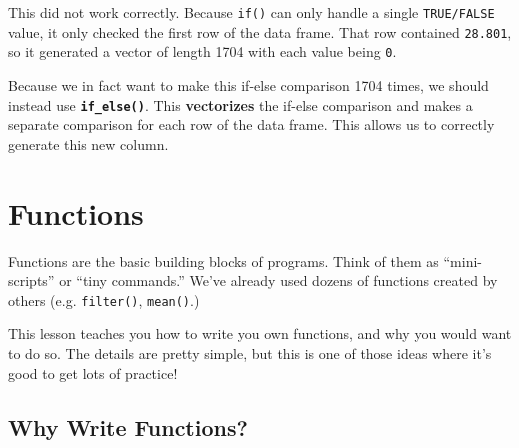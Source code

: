 \documentclass[]{book}
\newenvironment{Shaded}{\begin{snugshade}}{\end{snugshade}}
\newcommand{\KeywordTok}[1]{\textcolor[rgb]{0.13,0.29,0.53}{\textbf{#1}}}
\newcommand{\DataTypeTok}[1]{\textcolor[rgb]{0.13,0.29,0.53}{#1}}
\newcommand{\DecValTok}[1]{\textcolor[rgb]{0.00,0.00,0.81}{#1}}
\newcommand{\StringTok}[1]{\textcolor[rgb]{0.31,0.60,0.02}{#1}}
\newcommand{\CommentTok}[1]{\textcolor[rgb]{0.56,0.35,0.01}{\textit{#1}}}
\newcommand{\OperatorTok}[1]{\textcolor[rgb]{0.81,0.36,0.00}{\textbf{#1}}}
\newcommand{\NormalTok}[1]{#1}
\begin{document}
This did not work correctly. Because \texttt{if()} can only handle a
single \texttt{TRUE/FALSE} value, it only checked the first row of the
data frame. That row contained \texttt{28.801}, so it generated a vector
of length 1704 with each value being \texttt{0}.

Because we in fact want to make this if-else comparison 1704 times, we
should instead use \textbf{\texttt{if\_else()}}. This
\textbf{vectorizes} the if-else comparison and makes a separate
comparison for each row of the data frame. This allows us to correctly
generate this new column.

\begin{Shaded}
\end{Shaded}

\hypertarget{functions-1}{\section{Functions}\label{functions-1}}

Functions are the basic building blocks of programs. Think of them as
``mini-scripts'' or ``tiny commands.'' We've already used dozens of
functions created by others (e.g. \texttt{filter()}, \texttt{mean()}.)

This lesson teaches you how to write you own functions, and why you
would want to do so. The details are pretty simple, but this is one of
those ideas where it's good to get lots of practice!

\subsection{Why Write Functions?}\label{why-write-functions}
\end{document}
